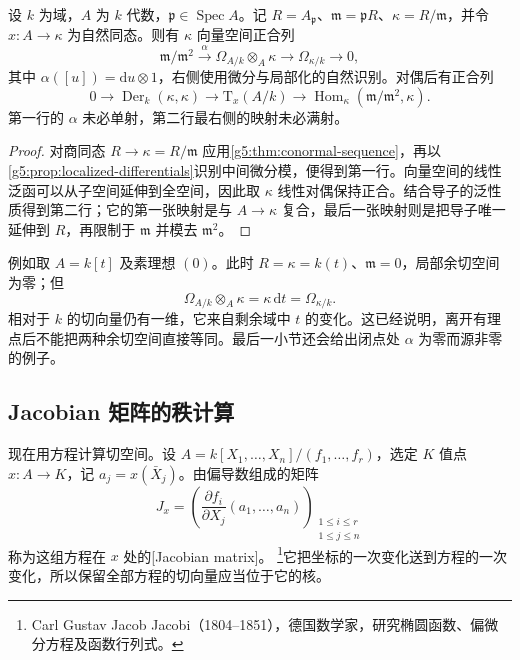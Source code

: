\begin{proposition}\label{g5:prop:residue-cotangent-tail}
	设 \(k\) 为域，\(A\) 为 \(k\) 代数，\(\mathfrak p\in\operatorname{Spec}A\)。记 \(R=A_{\mathfrak p}\)、\(\mathfrak m=\mathfrak pR\)、\(\kappa=R/\mathfrak m\)，并令 \(x:A\to\kappa\) 为自然同态。则有 \(\kappa\) 向量空间正合列
	\[
		\mathfrak m/\mathfrak m^2
		\xrightarrow{\alpha}\Omega_{A/k}\otimes_A\kappa
		\longrightarrow\Omega_{\kappa/k}\longrightarrow0,
	\]
	其中 \(\alpha([u])=\mathrm{d}u\otimes1\)，右侧使用微分与局部化的自然识别。对偶后有正合列
	\[
		0\longrightarrow\operatorname{Der}_k(\kappa,\kappa)
		\longrightarrow \mathrm{T}_x(A/k)
		\longrightarrow
		\operatorname{Hom}_\kappa(\mathfrak m/\mathfrak m^2,\kappa).
	\]
	第一行的 \(\alpha\) 未必单射，第二行最右侧的映射未必满射。
\end{proposition}
\begin{proof}
	对商同态 \(R\to\kappa=R/\mathfrak m\) 应用\cref{g5:thm:conormal-sequence}，再以\cref{g5:prop:localized-differentials}识别中间微分模，便得到第一行。向量空间的线性泛函可以从子空间延伸到全空间，因此取 \(\kappa\) 线性对偶保持正合。结合导子的泛性质得到第二行；它的第一张映射是与 \(A\to\kappa\) 复合，最后一张映射则是把导子唯一延伸到 \(R\)，再限制于 \(\mathfrak m\) 并模去 \(\mathfrak m^2\)。
\end{proof}

例如取 \(A=k[t]\) 及素理想 \((0)\)。此时 \(R=\kappa=k(t)\)、\(\mathfrak m=0\)，局部余切空间为零；但
\[
	\Omega_{A/k}\otimes_A\kappa
	=\kappa\,\mathrm{d}t=\Omega_{\kappa/k}.
\]
相对于 \(k\) 的切向量仍有一维，它来自剩余域中 \(t\) 的变化。这已经说明，离开有理点后不能把两种余切空间直接等同。最后一小节还会给出闭点处 \(\alpha\) 为零而源非零的例子。

\subsection{Jacobian 矩阵的秩计算}
\label{g5:subsec:0503:03}

现在用方程计算切空间。设 \(A=k[X_1,\ldots,X_n]/(f_1,\ldots,f_r)\)，选定 \(K\) 值点 \(x:A\to K\)，记 \(a_j=x(\bar X_j)\)。由偏导数组成的矩阵
\[
	J_x=\left(\frac{\partial f_i}{\partial X_j}(a_1,\ldots,a_n)\right)
	_{\substack{1\leq i\leq r\\1\leq j\leq n}}
\]
称为这组方程在 \(x\) 处的[Jacobian matrix]。
\footnote{Carl Gustav Jacob Jacobi（1804--1851），德国数学家，研究椭圆函数、偏微分方程及函数行列式。}它把坐标的一次变化送到方程的一次变化，所以保留全部方程的切向量应当位于它的核。

